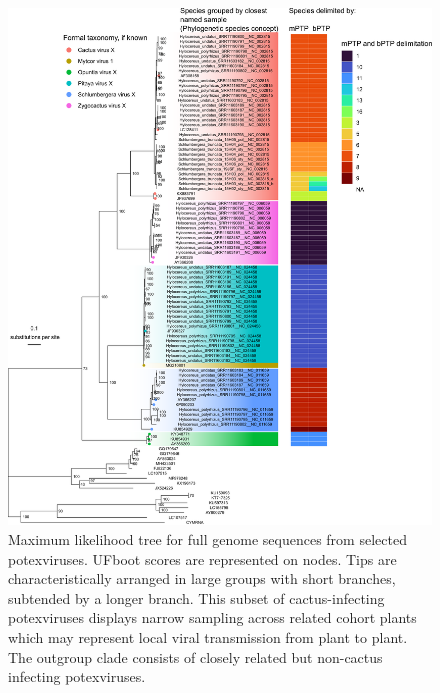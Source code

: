 \documentclass[fleqn,10pt,lineno]{wlpeerj}
\begin{document}
{\newpage{}
 \begin{figure}[ht]
 \centering
 \includegraphics[width=1\linewidth]{figures/delim-edited.pdf}
 \begin{NoHyper}
 \caption{
Maximum likelihood tree for full genome sequences from selected potexviruses. UFboot scores are represented on nodes. Tips are characteristically arranged in large groups with short branches, subtended by a longer branch. This subset of cactus-infecting potexviruses displays narrow sampling across related cohort plants which may represent local viral transmission from plant to plant. The outgroup clade consists of closely related but non-cactus infecting potexviruses.
}
 \label{fig:fig1}
 \end{NoHyper}
 \end{figure}

}
\end{document}
